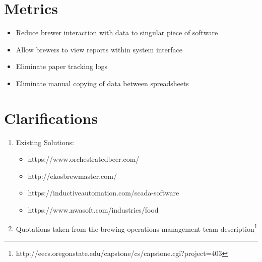 \documentclass[draftclsnofoot,onecolumn,letterpaper,10pt]{IEEEtran}
\begin{document}
\section{\textbf{Metrics}}
\begin{itemize}
\item {Reduce brewer interaction with data to singular piece of software}
\item {Allow brewers to view reports within system interface}
\item {Eliminate paper tracking logs}
\item {Eliminate manual copying of data between spreadsheets}
\end{itemize}

\section{\textbf{Clarifications}}
\begin{enumerate}
	\item {Existing Solutions:}
	\begin{itemize}
		\item {https://www.orchestratedbeer.com/}
		\item {http://ekosbrewmaster.com/}
		\item {https://inductiveautomation.com/scada-software}
		\item {https://www.nwasoft.com/industries/food}
	\end{itemize}
	\item {Quotations taken from the brewing operations management team description\footnote{http://eecs.oregonstate.edu/capstone/cs/capstone.cgi?project=403}}
\end{enumerate}
\end{document}

